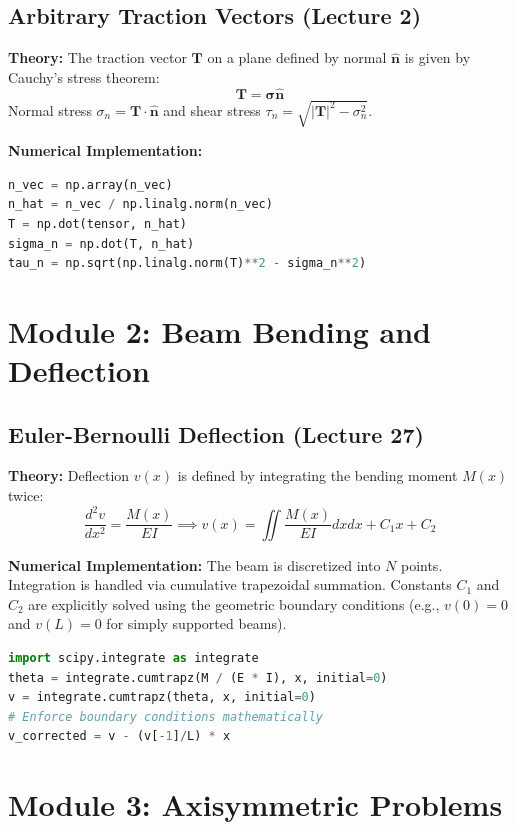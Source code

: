 \documentclass[11pt, a4paper]{article}
\begin{document}
\subsection{Arbitrary Traction Vectors (Lecture 2)}
\textbf{Theory:} The traction vector $\mathbf{T}$ on a plane defined by normal $\mathbf{\hat{n}}$ is given by Cauchy's stress theorem:
\begin{equation}
\mathbf{T} = \boldsymbol{\sigma} \mathbf{\hat{n}}
\end{equation}
Normal stress $\sigma_n = \mathbf{T} \cdot \mathbf{\hat{n}}$ and shear stress $\tau_n = \sqrt{|\mathbf{T}|^2 - \sigma_n^2}$.

\textbf{Numerical Implementation:}
\begin{lstlisting}[language=Python]
n_vec = np.array(n_vec)
n_hat = n_vec / np.linalg.norm(n_vec)
T = np.dot(tensor, n_hat)
sigma_n = np.dot(T, n_hat)
tau_n = np.sqrt(np.linalg.norm(T)**2 - sigma_n**2)
\end{lstlisting}

\section{Module 2: Beam Bending and Deflection}
\subsection{Euler-Bernoulli Deflection (Lecture 27)}
\textbf{Theory:} Deflection $v(x)$ is defined by integrating the bending moment $M(x)$ twice:
\begin{equation}
\frac{d^2v}{dx^2} = \frac{M(x)}{EI} \implies v(x) = \iint \frac{M(x)}{EI} dx dx + C_1 x + C_2
\end{equation}

\textbf{Numerical Implementation:}
The beam is discretized into $N$ points. Integration is handled via cumulative trapezoidal summation. Constants $C_1$ and $C_2$ are explicitly solved using the geometric boundary conditions (e.g., $v(0)=0$ and $v(L)=0$ for simply supported beams).
\begin{lstlisting}[language=Python]
import scipy.integrate as integrate
theta = integrate.cumtrapz(M / (E * I), x, initial=0)
v = integrate.cumtrapz(theta, x, initial=0)
# Enforce boundary conditions mathematically
v_corrected = v - (v[-1]/L) * x 
\end{lstlisting}

\section{Module 3: Axisymmetric Problems}
\end{document}
